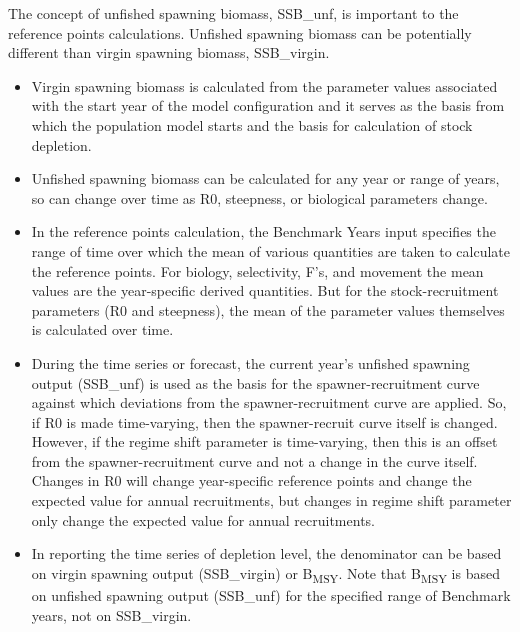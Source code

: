 The concept of unfished spawning biomass, SSB\_unf, is important to the reference points calculations. Unfished spawning biomass can be potentially different than virgin spawning biomass, SSB\_virgin.

\begin{itemize}
	\item Virgin spawning biomass is calculated from the parameter values associated with the start year of the model configuration and it serves as the basis from which the population model starts and the basis for calculation of stock depletion.
	
	\item Unfished spawning biomass can be calculated for any year or range of years, so can change over time as R0, steepness, or biological parameters change.
	
	\item In the reference points calculation, the Benchmark Years input specifies the range of time over which the mean of various quantities are taken to calculate the reference points. For biology, selectivity, F's, and movement the mean values are the year-specific derived quantities. But for the stock-recruitment parameters (R0 and steepness), the mean of the parameter values themselves is calculated over time.
	
	\item During the time series or forecast, the current year's unfished spawning output (SSB\_unf) is used as the basis for the spawner-recruitment curve against which deviations from the spawner-recruitment curve are applied. So, if R0 is made time-varying, then the spawner-recruit curve itself is changed. However, if the regime shift parameter is time-varying, then this is an offset from the spawner-recruitment curve and not a change in the curve itself. Changes in R0 will change year-specific reference points and change the expected value for annual recruitments, but changes in regime shift parameter only change the expected value for annual recruitments.
	
	\item In reporting the time series of depletion level, the denominator can be based on virgin spawning output (SSB\_virgin) or B\textsubscript{MSY}. Note that B\textsubscript{MSY} is based on unfished spawning output (SSB\_unf) for the specified range of Benchmark years, not on SSB\_virgin.
\end{itemize}


\hypertarget{ForeSpawn}{}
